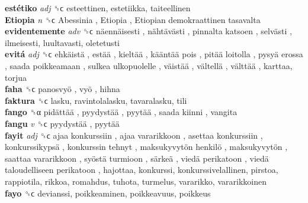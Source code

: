 \textbf{estétiko} \emph{adj}  ␝ϲ  esteettinen, estetiikka, taiteellinen  \\
\textbf{Etiopia} \emph{n}  ␝ϲ   Abessinia ,  Etiopia ,  Etiopian demokraattinen tasavalta   \\
\textbf{evidentemente} \emph{adv}  ␝ϲ   näennäisesti ,  nähtävästi ,  pinnalta katsoen ,  selvästi , ilmeisesti, luultavasti, oletetusti  \\
\textbf{evitá} \emph{adj}  ␝ϲ   ehkäistä ,  estää ,  kieltää ,  kääntää pois ,  pitää loitolla ,  pysyä erossa ,  saada poikkeamaan ,  sulkea ulkopuolelle ,  väistää ,  vältellä ,  välttää , karttaa, torjua  \\
\textbf{faha} ␝ϲ   panosvyö ,  vyö , hihna  \\
\textbf{faktura} ␝ϲ  lasku, ravintolalasku, tavaralasku, tili  \\
\textbf{fango} ␝α   pidättää ,  pyydystää ,  pyytää ,  saada kiinni , vangita  \\
\textbf{fangu} \emph{v}  ␝ϲ   pyydystää ,  pyytää   \\
\textbf{fayit} \emph{adj}  ␝ϲ   ajaa konkurssiin ,  ajaa vararikkoon ,  asettaa konkurssiin ,  konkurssikypsä ,  konkurssin tehnyt ,  maksukyvytön henkilö ,  maksukyvytön ,  saattaa vararikkoon ,  syöstä turmioon ,  särkeä ,  viedä perikatoon ,  viedä taloudelliseen perikatoon , hajottaa, konkurssi, konkurssivelallinen, pirstoa, rappiotila, rikkoa, romahdus, tuhota, turmelus, vararikko, vararikkoinen  \\
\textbf{fayo} ␝ϲ  devianssi, poikkeaminen, poikkeavuus, poikkeus  \\

